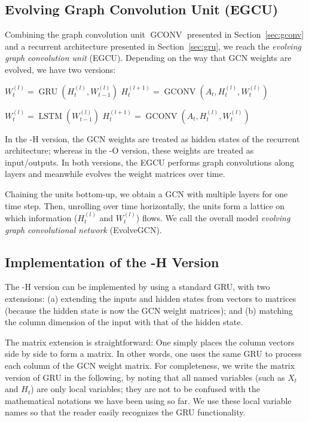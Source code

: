 \documentclass[letterpaper]{article} %
\DeclareMathOperator{\gru}{GRU}
\DeclareMathOperator{\lstm}{LSTM}
\DeclareMathOperator{\gconv}{GCONV}
\DeclareMathOperator{\egcuh}{EGCU-H}
\DeclareMathOperator{\egcuo}{EGCU-O}
\begin{document}
\subsection{Evolving Graph Convolution Unit (EGCU)}
Combining the graph convolution unit $\gconv$ presented in Section~\ref{sec:gconv} and a recurrent architecture presented in Section~\ref{sec:gru}, we reach the \emph{evolving graph convolution unit} (EGCU). Depending on the way that GCN weights are evolved, we have two versions:
\begin{algorithmic}[1]
  \baselineskip=15pt
  \Function {$[H_t^{(l+1)}, W_t^{(l)}] = \egcuh$}{$A_t, H_t^{(l)}, W_{t-1}^{(l)}$}
  \State $W_t^{(l)} = \gru(H_t^{(l)}, W_{t-1}^{(l)})$
  \State $H_t^{(l+1)} = \gconv(A_t, H_t^{(l)}, W_t^{(l)})$
  \EndFunction
\end{algorithmic}
\begin{algorithmic}[1]
  \baselineskip=15pt
  \Function {$[H_t^{(l+1)}, W_t^{(l)}] = \egcuo$}{$A_t, H_t^{(l)}, W_{t-1}^{(l)}$}
  \State $W_t^{(l)} = \lstm(W_{t-1}^{(l)})$
  \State $H_t^{(l+1)} = \gconv(A_t, H_t^{(l)}, W_t^{(l)})$
  \EndFunction
\end{algorithmic}
In the -H version, the GCN weights are treated as hidden states of the recurrent architecture; whereas in the -O version, these weights are treated as input/outputs. In both versions, the EGCU performs graph convolutions along layers and meanwhile evolves the weight matrices over time.

Chaining the units bottom-up, we obtain a GCN with multiple layers for one time step. Then, unrolling over time horizontally, the units form a lattice on which information ($H_t^{(l)}$ and $W_t^{(l)}$) flows. We call the overall model \emph{evolving graph convolutional network} (EvolveGCN).


\subsection{Implementation of the -H Version}
The -H version can be implemented by using a standard GRU, with two extensions: (a) extending the inputs and hidden states from vectors to matrices (because the hidden state is now the GCN weight matrices); and (b) matching the column dimension of the input with that of the hidden state.

The matrix extension is straightforward: One simply places the column vectors side by side to form a matrix. In other words, one uses the same GRU to process each column of the GCN weight matrix. For completeness, we write the matrix version of GRU in the following, by noting that all named variables (such as $X_t$ and $H_t$) are only local variables; they are not to be confused with the mathematical notations we have been using so far. We use these local variable names so that the reader easily recognizes the GRU functionality.
\end{document}
